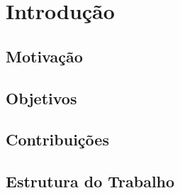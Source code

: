 \chapter[Introdução]{Introdução}

    \section{Motivação}
    
    \section{Objetivos}
    
    \section{Contribuições}
    
    \section{Estrutura do Trabalho}

